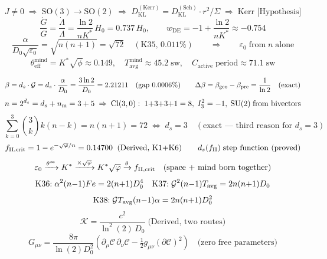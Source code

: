 \documentclass[12pt, a4paper]{article}
\begin{document}
\begin{keybox}[title={Extension: Kerr, Cosmic Rate, K35, Mind-Layer Bridge (v13)}]
{\small
\[
  J\neq 0 \;\Rightarrow\; \mathrm{SO}(3)\to\mathrm{SO}(2)
  \;\Rightarrow\; D_{\mathrm{KL}}^{(\mathrm{Kerr})} = D_{\mathrm{KL}}^{(\mathrm{Sch})}\cdot r^2/\Sigma
  \;\Rightarrow\; \text{Kerr [Hypothesis]}
\]
\[
  \frac{\dot{G}}{G} = \frac{\dot{\Lambda}}{\Lambda} = \frac{\ln 2}{nK^*}\,H_0
  = 0.737\,H_0, \qquad w_{\mathrm{DE}} = -1 + \frac{\ln 2}{nK^*} \approx -0.754
\]
\[
  \frac{\alpha}{D_0\sqrt{\varepsilon_0}} = \sqrt{n(n+1)} = \sqrt{72}
  \quad (\text{K35, }0.011\%)
  \qquad\Rightarrow\qquad \varepsilon_0 \;\text{from}\; n \;\text{alone}
\]
\[
  \theta_{\mathrm{eff}}^{\mathrm{mind}} = K^*\sqrt{\phi}\approx 0.149, \quad
  T_{\mathrm{avg}}^{\mathrm{mind}} \approx 45.2\;\text{sw}, \quad
  C_{\mathrm{active}}\;\text{period}\approx 71.1\;\text{sw}
\]
}
\end{keybox}

\begin{keybox}[title={Extension: Algebraic Closure --- Part~IX (v14)}]
{\small
\[
  \beta = d_s\cdot\mathcal{G} = d_s\cdot\frac{\alpha}{D_0}
  = \frac{3\ln 2}{D_0} = 2.21211 \quad (\text{gap }0.0006\%)
  \qquad \Delta\beta = \beta_{\rm geo}-\beta_{\rm pre} = \frac{1}{\ln 2} \quad (\text{exact})
\]
\[
  n = 2^{d_s} = d_s + n_{\rm m} = 3+5
  \;\Rightarrow\;
  \mathrm{Cl}(3,0):\; 1{+}3{+}3{+}1=8,\; I_3^2=-1,\; \mathrm{SU}(2)\;\text{from bivectors}
\]
\[
  \sum_{k=0}^{3}\binom{3}{k}k(n-k) = n(n+1) = 72
  \;\Leftrightarrow\; d_s=3 \quad (\text{exact --- third reason for }d_s=3)
\]
\[
  f_{\rm II,crit} = 1-e^{-\sqrt{\varphi}/n} = 0.14700 \;\;(\text{Derived, K1+K6})
  \qquad d_s(f_{\rm II})\;\text{step function (proved)}
\]
\[
  \varepsilon_0 \xrightarrow{\theta^\infty} K^* \xrightarrow{\times\sqrt{\varphi}}
  K^*\sqrt{\varphi} \xrightarrow{\theta} f_{\rm II,crit}
  \quad\text{(space + mind born together)}
\]
\[
  \text{K36:}\;\alpha^2(n{-}1)Fe=2(n{+}1)D_0^4 \quad
  \text{K37:}\;\mathcal{G}^2(n{-}1)T_{\rm avg}=2n(n{+}1)D_0
\]
\[
  \text{K38:}\;\mathcal{G}T_{\rm avg}(n{-}1)\alpha=2n(n{+}1)D_0^2
\]
\[
  \mathcal{K} = \frac{c^2}{\ln^2(2)\,D_0} \;\text{(Derived, two routes)}
\]
\[
  G_{\mu\nu} = \frac{8\pi}{\ln(2)D_0^2}
  \!\left(\partial_\mu\mathcal{C}\,\partial_\nu\mathcal{C}
  - \tfrac{1}{2}g_{\mu\nu}(\partial\mathcal{C})^2\right)
  \quad \text{(zero free parameters)}
\]
}
\end{keybox}
\end{document}
